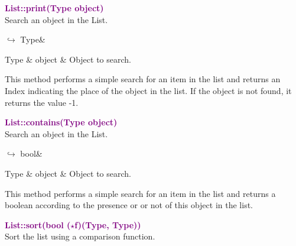 \textcolor{purple}{\textbf{List::print(Type object)}}\label{List::print(Type object)}\\
Search an object in the List.\vspace*{-0.5em}
\begin{tcolorbox}[grow to left by=-1cm, width=\textwidth-1cm,myArgs,tabularx={l|R}]
$\hookrightarrow$ Type&
\end{tcolorbox}

\begin{tcolorbox}[width=\textwidth,myArgs,tabularx={ll|R}]
Type & object & Object to search.
\end{tcolorbox}

This method performs a simple search for an item in the list and returns an Index indicating the place of the object in the list.
If the object is not found, it returns the value -1.

\textcolor{purple}{\textbf{List::contains(Type object)}}\label{List::contains(Type object)}\\
Search an object in the List.\vspace*{-0.5em}
\begin{tcolorbox}[grow to left by=-1cm, width=\textwidth-1cm,myArgs,tabularx={l|R}]
$\hookrightarrow$ bool&
\end{tcolorbox}

\begin{tcolorbox}[width=\textwidth,myArgs,tabularx={ll|R}]
Type & object & Object to search.
\end{tcolorbox}

This method performs a simple search for an item in the list and returns a boolean according to the presence or or not of this object in the list.

\textcolor{purple}{\textbf{List::sort(bool ($\star$f)(Type, Type))}}\label{List::sort(bool (*f)(Type, Type))}\\
Sort the list using a comparison function.

